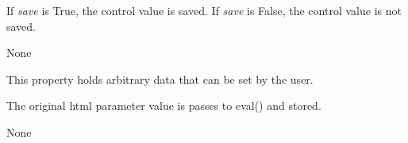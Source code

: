 \documentclass[letterpaper,10pt,english]{sphinxmanual}
\begin{document}
\begin{fulllineitems}
\begin{fulllineitems}
If \emph{save} is True, the control value is saved.
If \emph{save} is False, the control value is not saved.

\end{fulllineitems}


\begin{fulllineitems}
\label{api:controls.TextBox.scroll}
None

\end{fulllineitems}


\begin{fulllineitems}
\label{api:controls.TextBox.user}
This property holds arbitrary data that can be set by the user.

The original html parameter value is passes to eval() and stored.

\end{fulllineitems}


\begin{fulllineitems}
\label{api:controls.TextBox.value}
None

\end{fulllineitems}


\end{fulllineitems}

\end{document}
